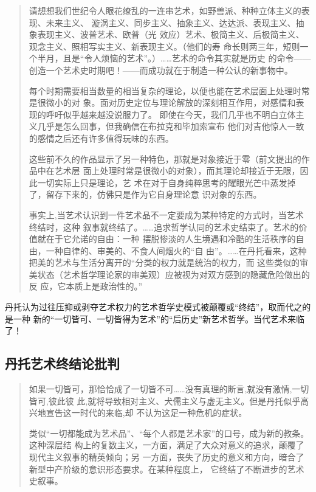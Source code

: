 \begin{quotation}

  请想想我们世纪令人眼花缭乱的一连串艺术，如野兽派、种种立体主义的表现、未来主义、
  漩涡主义、同步主义、抽象主义、达达派、表现主义、抽象表现主义、波普艺术、欧普（光
  效应）艺术、极简主义、后极简主义、观念主义、照相写实主义、新表现主义。（他们的寿
  命长则两三年，短则一个半月，且是“令人烦恼的艺术”。）……艺术的命令其实就是历史
  的命令——创造一个艺术史时期吧！——而成功就在于制造一种公认的新事物中。

  每个时期需要相当数量的相当复杂的理论，以便也能在艺术层面上处理时常是很微小的对
  象。面对历史定位与理论解放的深刻相互作用，对感情和表现的呼吁似乎越来越没说服力了。
  即使在今天，我们几乎也不明白立体主义几乎是怎么回事，但我确信在布拉克和毕加索宣布
  他们对吉他惊人一致的感情之后还有许多值得玩味的东西。

  这些前不久的作品显示了另一种特色，那就是对象接近于零（前文提出的作品中在艺术层
  面上处理时常是很微小的对象），而其理论却接近于无限，因此一切实际上只是理论，艺
  术在对于自身纯粹思考的耀眼光芒中蒸发掉了，留存下来的，仿佛只是作为它自身理论意
  识对象的东西。

  事实上,当艺术认识到一件艺术品不一定要成为某种特定的方式时，当艺术终结时，这种
  叙事就终结了。……追求哲学认同的艺术史结束了。艺术的价值就在于它允诺的自由：一种
  摆脱惨淡的人生境遇和冷酷的生活秩序的自由，一种自律的、审美的、不食人间烟火的“自
  由”。……在丹托看来，这种把美的艺术与生活分离开的“分类的权力就是统治的权力，而
  这些类似的审美状态（艺术哲学理论家的审美观）应被视为对双方感到的隐藏危险做出的反
  应，它本质上是政治性的。”\cite{dantuozhenduan}

\end{quotation}

丹托认为过往压抑或剥夺艺术权力的艺术哲学史模式被颠覆或“终结”，取而代之的是一种
新的“一切皆可、一切皆得为艺术”的“后历史”新艺术哲学。当代艺术来临了！

\subsection{丹托艺术终结论批判}

\begin{quotation}

如果一切皆可，那恰恰成了一切皆不可……没有真理的断言,就没有激情,一切皆可,彼此彼
此,就将导致相对主义、犬儒主义与虚无主义。但是丹托似乎高兴地宣告这一时代的来临,却
不认为这足一种危机的症状。\cite{fuwendantuo}

类似“一切都能成为艺术品”、“每个人都是艺术家”的口号，成为新的教条。这种深层结
构上的复数主义，一方面，满足了大众对意义的追求，颠覆了现代主义叙事的精英倾向；另
一方面，丧失了历史的意义和方向，暗合了新型中产阶级的意识形态要求。在某种程度上，
它终结了不断进步的艺术史叙事。\cite{dantuozhenduan}
\end{quotation}

